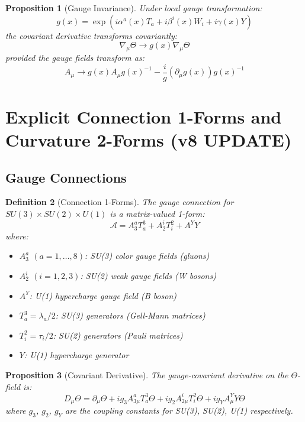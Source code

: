 \documentclass[12pt]{article}
\newtheorem{definition}{Definition}[section]
\newtheorem{proposition}[definition]{Proposition}
\begin{document}
\begin{proposition}[Gauge Invariance]
Under local gauge transformation:
\begin{equation}
g(x) = \exp\left(i\alpha^a(x) T_a + i\beta^i(x) W_i + i\gamma(x) Y\right)
\end{equation}
the covariant derivative transforms covariantly:
\begin{equation}
\nabla_\mu \Theta \to g(x) \nabla_\mu \Theta
\end{equation}
provided the gauge fields transform as:
\begin{equation}
A_\mu \to g(x) A_\mu g(x)^{-1} - \frac{i}{g}(\partial_\mu g(x)) g(x)^{-1}
\end{equation}
\end{proposition}

\section{Explicit Connection 1-Forms and Curvature 2-Forms (v8 UPDATE)}

\subsection{Gauge Connections}

\begin{definition}[Connection 1-Forms]
The gauge connection for $SU(3) \times SU(2) \times U(1)$ is a matrix-valued 1-form:
\begin{equation}
\mathcal{A} = A^a_3 T_a^3 + A^i_2 T_i^2 + A^Y Y
\end{equation}
where:
\begin{itemize}
\item $A^a_3$ $(a=1,\ldots,8)$: SU(3) color gauge fields (gluons)
\item $A^i_2$ $(i=1,2,3)$: SU(2) weak gauge fields (W bosons)
\item $A^Y$: U(1) hypercharge gauge field (B boson)
\item $T_a^3 = \lambda_a/2$: SU(3) generators (Gell-Mann matrices)
\item $T_i^2 = \tau_i/2$: SU(2) generators (Pauli matrices)
\item $Y$: U(1) hypercharge generator
\end{itemize}
\end{definition}

\begin{proposition}[Covariant Derivative]
The gauge-covariant derivative on the $\Theta$-field is:
\begin{equation}
D_\mu \Theta = \partial_\mu \Theta + ig_3 A^a_{3\mu} T_a^3 \Theta + ig_2 A^i_{2\mu} T_i^2 \Theta + ig_Y A^Y_\mu Y \Theta
\label{eq:covariant_derivative}
\end{equation}
where $g_3$, $g_2$, $g_Y$ are the coupling constants for SU(3), SU(2), U(1) respectively.
\end{proposition}
\end{document}
